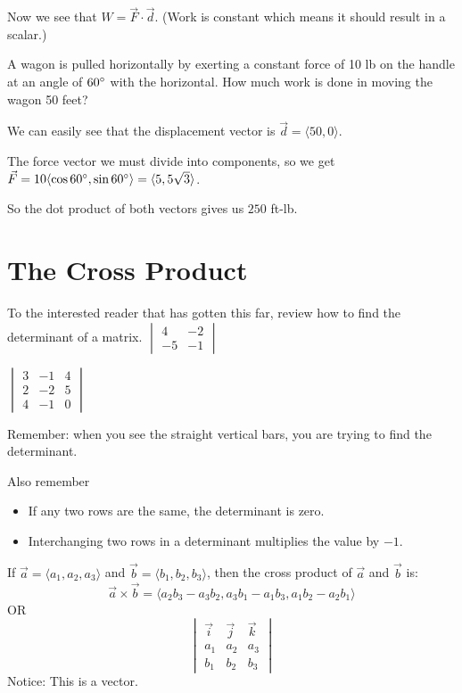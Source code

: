 \documentclass[../calc3.tex]{subfiles}
\begin{document}
Now we see that $W=\vec{F}\cdot \vec{d}$. (Work is constant which means it should result in a scalar.)

\begin{example}
    A wagon is pulled horizontally by exerting a constant force of 10 lb on the handle at an angle of $60\degree$ with the horizontal. How much work is done in moving the wagon 50 feet?

    We can easily see that the displacement vector is $\vec{d}=\langle 50,0\rangle$.

    The force vector we must divide into components, so we get $\vec{F}=10\langle \cos 60\degree, \sin 60\degree\rangle = \langle 5,5\sqrt{3}\rangle$.

    So the dot product of both vectors gives us $250$ ft-lb.
\end{example}

\section{The Cross Product}
To the interested reader that has gotten this far, review how to find the determinant of a matrix.
\ex $\begin{vmatrix}
    4&-2\\-5&-1
\end{vmatrix}$

\ex $\begin{vmatrix}
    3&-1&4\\2&-2&5\\4&-1&0
\end{vmatrix}$

Remember: when you see the straight vertical bars, you are trying to find the determinant.

Also remember 
\begin{itemize}
    \item If any two rows are the same, the determinant is zero.
    \item Interchanging two rows in a determinant multiplies the value by $-1$.
\end{itemize}

\begin{definition}
    If $\vec{a}=\langle a_1,a_2,a_3\rangle$ and $\vec{b}=\langle b_1,b_2,b_3\rangle$, then the cross product of $\vec{a}$ and $\vec{b}$ is:
    \[ \vec{a}\times \vec{b}=\langle a_2b_3-a_3b_2,a_3b_1-a_1b_3,a_1b_2-a_2b_1\rangle \]
    OR 
    \[ \begin{vmatrix}
        \vec{i} & \vec{j} & \vec{k}\\
        a_1 & a_2 & a_3\\
        b_1 & b_2 & b_3
    \end{vmatrix} \]
    Notice: This is a vector.
\end{definition}
\end{document}
